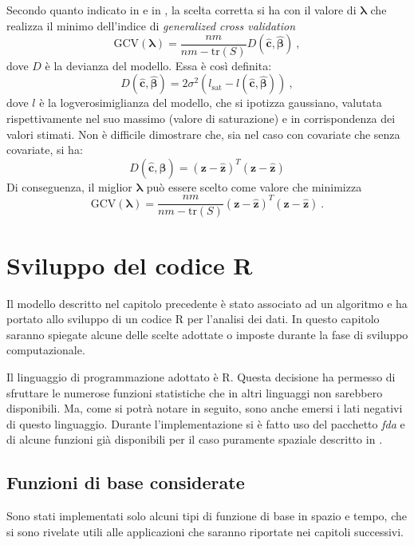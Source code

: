 \documentclass[a4paper,11pt,twoside,openright]{book}							%
\begin{document}
Secondo quanto indicato in \cite{art:gcv} e in \cite{art:marra}, la scelta corretta si ha con il valore di $\bm \lambda$ che realizza il minimo dell'indice di \textit{generalized cross validation}
$$
\mathrm{GCV}(\bm \lambda) =\frac{nm}{nm-\text{tr}(S)}  D(\hat  {\bm c},\hat  {\bm \beta}) \ ,
$$
dove $D$ è la devianza del modello. Essa è così definita:
$$
D(\hat  {\bm c},\hat  {\bm \beta})=2\sigma^2(l_{\mathrm{sat}}-l(\hat  {\bm c},\hat  {\bm \beta})) \ ,
$$
dove $l$ è la logverosimiglianza del modello, che si ipotizza gaussiano, valutata rispettivamente nel suo massimo (valore di saturazione) e in corrispondenza dei valori stimati. Non è difficile dimostrare che, sia nel caso con covariate che senza covariate, si ha: 
$$
D(\hat  {\bm c},\hat  {\bm \beta}) = (\bm z - \hat  {\bm z})^T(\bm z - \hat  {\bm z})
$$
Di conseguenza, il miglior $\bm \lambda$ può essere scelto come valore che minimizza
\begin{equation}
\label{eq:GCV}
\mathrm{GCV}(\bm \lambda) =\frac{nm}{nm-\text{tr}(S)}  (\bm z - \hat  {\bm z})^T(\bm z - \hat  {\bm z}) \ .
\end{equation}
\newpage
\thispagestyle{empty}


\chapter{Sviluppo del codice R}
\label{cap:Codice}
Il modello descritto nel capitolo precedente è stato associato ad un algoritmo e ha portato allo sviluppo di un codice R per l'analisi dei dati. In questo capitolo saranno spiegate alcune delle scelte adottate o imposte durante la fase di sviluppo computazionale.

Il linguaggio di programmazione adottato è R. Questa decisione ha permesso di sfruttare le numerose funzioni statistiche che in altri linguaggi non sarebbero disponibili. Ma, come si potrà notare in seguito, sono anche emersi i lati negativi di questo linguaggio. Durante l'implementazione si è fatto uso del pacchetto \textit{fda} e di alcune funzioni già disponibili per il caso puramente spaziale descritto in \cite{art:sangalli}.

\section{Funzioni di base considerate}
Sono stati implementati solo alcuni tipi di funzione di base in spazio e tempo, che si sono rivelate utili alle applicazioni che saranno riportate nei capitoli successivi. 
\end{document}
